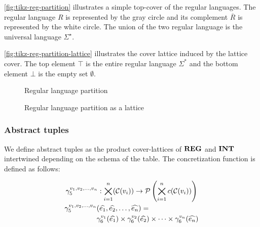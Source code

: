 
\autoref{fig:tikz-reg-partition} illustrates a simple top-cover of the regular languages.
The regular language $R$ is represented by the gray circle and its complement $\overline{R}$ is represented by the white circle.
The union of the two regular language is the universal language $\Sigma^\star$.

\autoref{fig:tikz-reg-partition-lattice} illustrates the cover lattice induced by the lattice cover.
The top element $\top$ is the entire regular language $\Sigma^*$ and the bottom element $\bot$ is the empty set $\emptyset$.


\begin{figure}
    \center
    
    \caption{Regular language partition}
    \label{fig:tikz-reg-partition}
\end{figure}

\begin{figure}[!htb]
    \center
    
    \caption{Regular language partition as a lattice}
    \label{fig:tikz-reg-partition-lattice}
\end{figure}

\subsubsection{Abstract tuples}\label{subsubsec:abstract-tuples}

We define abstract tuples as the product cover-lattices of $\mathbf{REG}$ and $\mathbf{INT}$ intertwined depending on the schema of the table.
The concretization function is defined as follows:


\begin{gather}
    \gamma^{v_1, v_2, \dots, v_n}_5 : \bigtimes_{i = 1}^{n}(\mathcal{C}(v_i)) \rightarrow \mathcal{P}\left(\bigtimes_{i = 1}^n c(\mathcal{C}(v_i)) \right)\\
    \begin{split}
        \gamma^{v_1, v_2, \dots, v_n}_5 & (\widehat{e_1}, \widehat{e_2}, \dots, \widehat{e_n}) = \\
         &\gamma^{v_1}_6(\widehat{e_1}) \times \gamma^{v_2}_6(\widehat{e_2}) \times \dots \times \gamma^{v_n}_6(\widehat{e_n})
    \end{split}
\end{gather}

